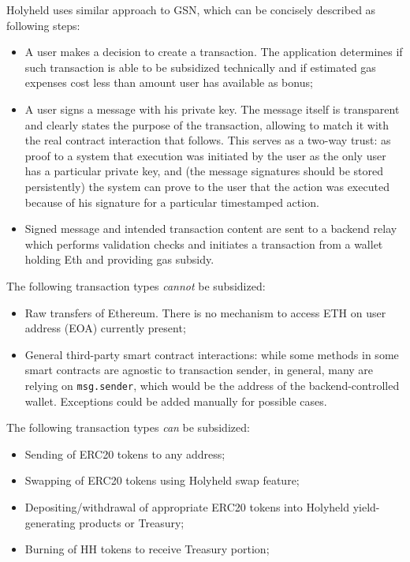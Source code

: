\documentclass[12pt]{article}
\begin{document}
Holyheld uses similar approach to GSN, which can be concisely described as following steps:
\begin{itemize}
\item A user makes a decision to create a transaction. The application determines if such transaction is able to be subsidized technically and if estimated gas expenses cost less than amount user has available as bonus;
\item A user signs a message with his private key. The message itself is transparent and clearly states the purpose of the transaction, allowing to match it with the real contract interaction that follows. This serves as a two-way trust: as proof to a system that execution was initiated by the user as the only user has a particular private key, and (the message signatures should be stored persistently) the system can prove to the user that the action was executed because of his signature for a particular timestamped action.
\item Signed message and intended transaction content are sent to a backend relay which performs validation checks and initiates a transaction from a wallet holding Eth and providing gas subsidy.
\end{itemize}

The following transaction types \emph{cannot} be subsidized:
\begin{itemize}
\item Raw transfers of Ethereum. There is no mechanism to access ETH on user address (EOA) currently present;
\item General third-party smart contract interactions: while some methods in some smart contracts are agnostic to transaction sender, in general, many are relying on \texttt{msg.sender}, which would be the address of the backend-controlled wallet. Exceptions could be added manually for possible cases.
\end{itemize}

The following transaction types \emph{can} be subsidized:
\begin{itemize}
\item Sending of ERC20 tokens to any address;
\item Swapping of ERC20 tokens using Holyheld swap feature;
\item Depositing/withdrawal of appropriate ERC20 tokens into Holyheld yield-generating products or Treasury;
\item Burning of HH tokens to receive Treasury portion;
\end{itemize}
\end{document}
